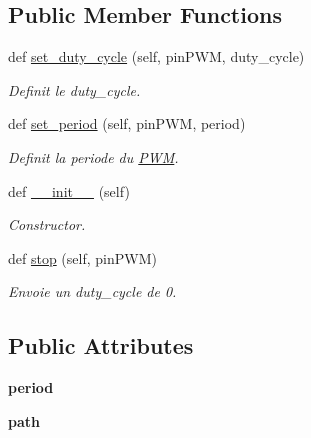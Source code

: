 \subsection*{Public Member Functions}
\begin{DoxyCompactItemize}
\item 
def \hyperlink{classpwm_1_1PWM_aecbf9d1e49de6ac566cb2fc2166006b8}{set\+\_\+duty\+\_\+cycle} (self, pin\+P\+WM, duty\+\_\+cycle)
\begin{DoxyCompactList}\small\item\em Definit le duty\+\_\+cycle. \end{DoxyCompactList}\item 
def \hyperlink{classpwm_1_1PWM_ad9deb36402c7415728071e5cc9d00ef0}{set\+\_\+period} (self, pin\+P\+WM, period)
\begin{DoxyCompactList}\small\item\em Definit la periode du \hyperlink{classpwm_1_1PWM}{P\+WM}. \end{DoxyCompactList}\item 
def \hyperlink{classpwm_1_1PWM_aa911dffbe75afb2bbeca8f7cb4361e03}{\+\_\+\+\_\+init\+\_\+\+\_\+} (self)\hypertarget{classpwm_1_1PWM_aa911dffbe75afb2bbeca8f7cb4361e03}{}\label{classpwm_1_1PWM_aa911dffbe75afb2bbeca8f7cb4361e03}

\begin{DoxyCompactList}\small\item\em Constructor. \end{DoxyCompactList}\item 
def \hyperlink{classpwm_1_1PWM_a6e5d3baeb7ce9e250980638733bf62ef}{stop} (self, pin\+P\+WM)
\begin{DoxyCompactList}\small\item\em Envoie un duty\+\_\+cycle de 0. \end{DoxyCompactList}\end{DoxyCompactItemize}
\subsection*{Public Attributes}
\begin{DoxyCompactItemize}
\item 
{\bfseries period}\hypertarget{classpwm_1_1PWM_a97e8c6f96847cd6a4bf641b7da51dfe7}{}\label{classpwm_1_1PWM_a97e8c6f96847cd6a4bf641b7da51dfe7}

\item 
{\bfseries path}\hypertarget{classpwm_1_1PWM_a2caefbe7eb198384cf8538367e9f883f}{}\label{classpwm_1_1PWM_a2caefbe7eb198384cf8538367e9f883f}

\end{DoxyCompactItemize}


